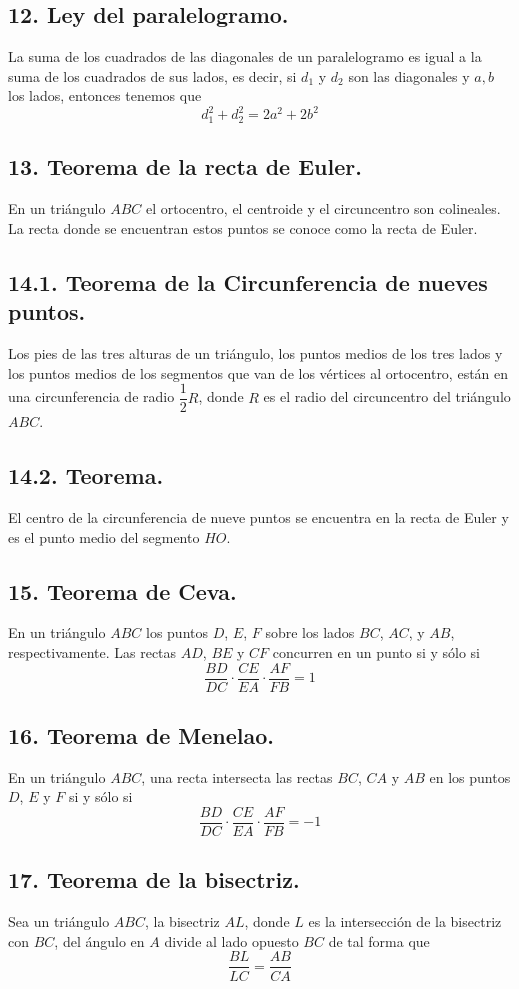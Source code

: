 \documentclass[12pt,a4paper]{article}
\begin{document}
\subsection*{12. Ley del paralelogramo.}
La suma de los cuadrados de las diagonales de un paralelogramo es igual a la suma de los cuadrados de sus lados, es decir, si $d_1$ y $d_2$ son las diagonales y $a, b$ los lados, entonces tenemos que 
$$d_1^2 + d_2^2=2a^2+2b^2$$
\subsection*{13. Teorema de la recta de Euler.}
En un triángulo $ABC$ el ortocentro, el centroide y el circuncentro son colineales. La recta donde se encuentran estos puntos se conoce como la recta de Euler.
\subsection*{14.1. Teorema de la Circunferencia de nueves puntos.}
Los pies de las tres alturas de un triángulo, los puntos medios de los tres lados y los puntos medios de los segmentos que van de los vértices al ortocentro, están en una circunferencia de radio $\dfrac{1}{2}R$, donde $R$ es el radio del circuncentro del triángulo $ABC$.
\subsection*{14.2. Teorema.}
El centro de la circunferencia de nueve puntos se encuentra en la recta de Euler y es el punto medio del segmento $HO$.
\subsection*{15. Teorema de Ceva.}
En un triángulo $ABC$ los puntos $D$, $E$, $F$ sobre los lados $BC$, $AC$, y $AB$, respectivamente. Las rectas $AD$, $BE$ y $CF$ concurren en un punto si y sólo si
$$\dfrac{BD}{DC}\cdot\dfrac{CE}{EA}\cdot\dfrac{AF}{FB}=1$$
\subsection*{16. Teorema de Menelao.}
En un triángulo $ABC$, una recta intersecta las rectas $BC$, $CA$ y $AB$ en los puntos $D$, $E$ y $F$ si y sólo si
$$\dfrac{BD}{DC}\cdot\dfrac{CE}{EA}\cdot\dfrac{AF}{FB}=-1$$
\subsection*{17. Teorema de la bisectriz.}
Sea un triángulo $ABC$, la bisectriz $AL$, donde $L$ es la intersección de la bisectriz con $BC$, del ángulo en $A$ divide al lado opuesto $BC$ de tal forma que
$$\dfrac{BL}{LC}=\dfrac{AB}{CA}$$
\end{document}
